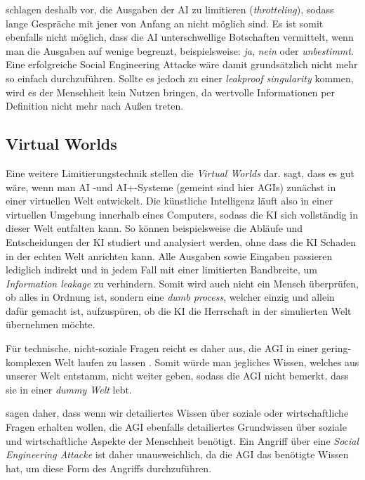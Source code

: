        \citealp{armstrongforthcoming} schlagen deshalb vor, die Ausgaben der AI zu limitieren (\textit{throtteling}), sodass
        lange Gespräche mit jener von Anfang an nicht möglich sind.\cite[s. 306]{armstrongforthcoming} Es ist somit
        ebenfalls nicht möglich, dass die AI unterschwellige Botschaften vermittelt, wenn man die Ausgaben auf wenige
        begrenzt, beispielsweise: \textit{ja}, \textit{nein} oder \textit{unbestimmt}. Eine erfolgreiche Social Engineering
        Attacke wäre damit grundsätzlich nicht mehr so einfach durchzuführen.\cite[s. 309]{armstrongforthcoming}
        Sollte es jedoch zu einer \textit{leakproof singularity} kommen, wird es der Menschheit kein Nutzen bringen, da
        wertvolle Informationen per Definition nicht mehr nach Außen treten.

        \subsection{Virtual Worlds}
        Eine weitere Limitierungstechnik stellen die \textit{Virtual Worlds} dar. \citeauthor{chalmers2010singularity} sagt,
        dass es gut wäre, wenn man AI -und AI+-Systeme (gemeint sind hier AGIs) zunächst in einer virtuellen Welt
        entwickelt. \cite[s. 37]{chalmers2010singularity} Die künstliche Intelligenz läuft also in einer virtuellen Umgebung
        innerhalb eines Computers, sodass die KI sich vollständig in dieser Welt entfalten kann. So können beispielsweise
        die Abläufe und Entscheidungen der KI studiert und analysiert werden, ohne dass die KI Schaden in der echten Welt
        anrichten kann. Alle Ausgaben sowie Eingaben passieren lediglich indirekt und in jedem Fall mit einer limitierten
        Bandbreite, um \textit{Information leakage} zu verhindern. \cite[s. 310]{armstrongforthcoming} Somit wird auch
        nicht ein Mensch überprüfen, ob alles in Ordnung ist, sondern eine \textit{dumb process}, welcher einzig und allein
        dafür gemacht ist, aufzuspüren, ob die KI die Herrschaft in der simulierten Welt übernehmen möchte.

        Für technische, nicht-soziale Fragen reicht es daher aus, die AGI in einer gering-komplexen Welt laufen zu lassen
        \cite[s. 310]{armstrongforthcoming}. Somit würde man jegliches Wissen, welches aus unserer Welt entstamm, nicht
        weiter geben, sodass die AGI nicht bemerkt, dass sie in einer \textit{dummy Welt} lebt.

        \citealp{armstrongforthcoming} sagen daher, dass wenn wir detailiertes Wissen über soziale oder wirtschaftliche
        Fragen erhalten wollen, die AGI ebenfalls detailiertes Grundwissen über soziale und wirtschaftliche Aspekte der
        Menschheit benötigt. Ein Angriff über eine \textit{Social Engineering Attacke} ist daher unausweichlich, da die
        AGI das benötigte Wissen hat, um diese Form des Angriffs durchzuführen.\cite[s. 310]{armstrongforthcoming}


